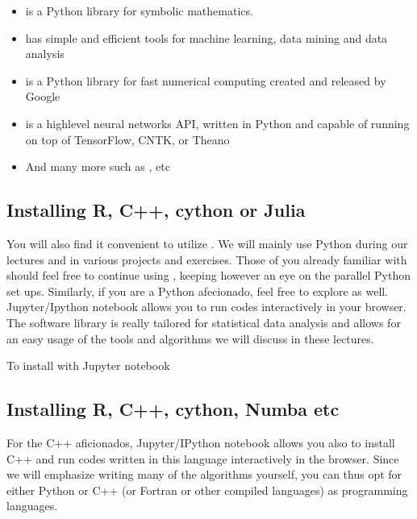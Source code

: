 \documentclass[letterpaper,10pt,english]{sphinxmanual}
\begin{document}
\begin{itemize}
\item {} 
 is a Python library for symbolic mathematics.

\item {} 
 has simple and efficient tools for machine learning, data mining and data analysis

\item {} 
 is a Python library for fast numerical computing created and released by Google

\item {} 
 is a high\sphinxhyphen{}level neural networks API, written in Python and capable of running on top of TensorFlow, CNTK, or Theano

\item {} 
And many more such as ,   etc

\end{itemize}


\subsection{Installing R, C++, cython or Julia}
\label{\detokenize{chapter2:installing-r-c-cython-or-julia}}
You will also find it convenient to utilize . We will mainly
use Python during our lectures and in various projects and exercises.
Those of you
already familiar with  should feel free to continue using , keeping
however an eye on the parallel Python set ups. Similarly, if you are a
Python afecionado, feel free to explore  as well.  Jupyter/Ipython
notebook allows you to run  codes interactively in your
browser. The software library  is really tailored  for statistical data analysis
and allows for an easy usage of the tools and algorithms we will discuss in these
lectures.

To install  with Jupyter notebook


\subsection{Installing R, C++, cython, Numba etc}
\label{\detokenize{chapter2:installing-r-c-cython-numba-etc}}
For the C++ aficionados, Jupyter/IPython notebook allows you also to
install C++ and run codes written in this language interactively in
the browser. Since we will emphasize writing many of the algorithms
yourself, you can thus opt for either Python or C++ (or Fortran or other compiled languages) as programming
languages.
\end{document}
